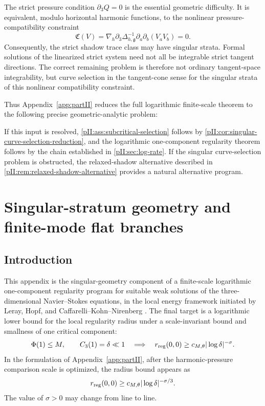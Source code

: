 \documentclass[11pt]{article}
\numberwithin{equation}{section}
\theoremstyle{plain}
\theoremstyle{definition}
\theoremstyle{remark}
\begin{document}
The strict pressure condition $\partial_3Q=0$ is the essential geometric difficulty.  It is equivalent, modulo horizontal harmonic functions, to the nonlinear pressure-compatibility constraint
\[
        \mathfrak C(V)=\nabla_h\partial_3\Delta_{h,\mathfrak g}^{-1}\partial_a\partial_b(V_aV_b)=0.
\]
Consequently, the strict shadow trace class may have singular strata.  Formal solutions of the linearized strict system need not all be integrable strict tangent directions.  The correct remaining problem is therefore not ordinary tangent-space integrability, but curve selection in the tangent-cone sense for the singular strata of this nonlinear compatibility constraint.

Thus Appendix~\ref{app:partII} reduces the full logarithmic finite-scale theorem to the following precise geometric-analytic problem:
\begin{center}
\end{center}
If this input is resolved, \cref{pII:ass:subcritical-selection} follows by \cref{pII:cor:singular-curve-selection-reduction}, and the logarithmic one-component regularity theorem follows by the chain established in \cref{pII:sec:log-rate}.  If the singular curve-selection problem is obstructed, the relaxed-shadow alternative described in \cref{pII:rem:relaxed-shadow-alternative} provides a natural alternative program.

\section{Singular-stratum geometry and finite-mode flat branches}\label{app:partIII}

\subsection{Introduction}

This appendix is the singular-geometry component of a finite-scale logarithmic one-component regularity
program for suitable weak solutions of the three-dimensional Navier--Stokes equations,
in the local energy framework initiated by Leray, Hopf, and Caffarelli--Kohn--Nirenberg
\cite{Leray1934,Hopf1951,Prodi1959,Serrin1962,Scheffer1976,CKN1982,Struwe1988,Lin1998,Seregin2015}.
The final target is a logarithmic lower bound for the local regularity radius under a
scale-invariant bound and smallness of one critical component:
\begin{equation}\label{pIII:eq:final-target}
        \Phi(1)\le M,
        \qquad
        C_3(1)=\delta\ll1
        \quad\Longrightarrow\quad
        r_{\rm reg}(0,0)
        \ge c_{M,\theta}|\log\delta|^{-\sigma}.
\end{equation}
In the formulation of Appendix~\ref{app:partII}, after the harmonic-pressure comparison scale is
optimized, the radius bound appears as
\[
        r_{\rm reg}(0,0)
        \ge c_{M,\theta}|\log\delta|^{-\sigma/3}.
\]
The value of \(\sigma>0\) may change from line to line.
\end{document}

